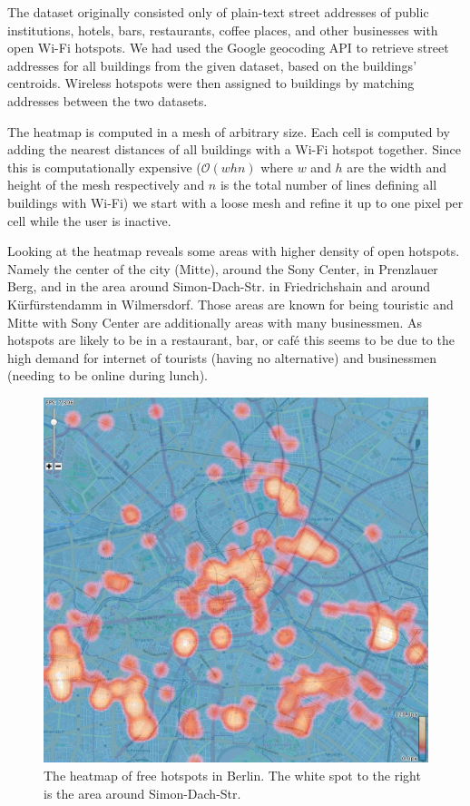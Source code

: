 The dataset originally consisted only of plain-text street addresses
of public institutions, hotels, bars, restaurants, coffee places, and other businesses with open Wi-Fi hotspots. We had used the Google geocoding API to retrieve street addresses for all buildings from the given dataset, based on the buildings' centroids. Wireless hotspots were then assigned to buildings by matching addresses between the two datasets.

The heatmap is computed in a mesh of
arbitrary size. Each cell is computed by adding
the nearest distances of all buildings with a Wi-Fi
hotspot together.
Since this is computationally expensive ($\mathcal{O}(whn)$ where $w$ and $h$
are the width and height of the mesh respectively and $n$ is the total number of lines
defining all buildings with Wi-Fi)
we start with a loose mesh and refine it up to one pixel per cell while the
user is inactive.

Looking at the heatmap reveals some areas with higher density of open hotspots.
Namely the center of the city (Mitte), around the Sony Center, in Prenzlauer Berg, and
in the area around Simon-Dach-Str. in Friedrichshain and around Kürfürstendamm in Wilmersdorf.
Those areas are known for being touristic and Mitte with Sony Center are additionally
areas with many businessmen.
As hotspots are likely to be in a restaurant, bar, or caf\'{e}
this seems to be due to the high demand for internet
of tourists (having no alternative) and businessmen (needing to
be online during lunch).

\begin{figure}
\centering
\includegraphics[width=0.9\linewidth]{imgs/heat}
\caption{The heatmap of free hotspots in Berlin.
The white spot to the right is the area around Simon-Dach-Str.}
\label{fig:heat}
\end{figure}


